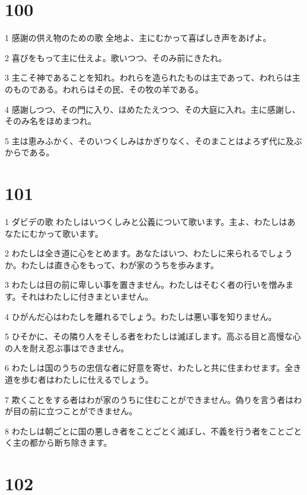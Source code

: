 \chapter{100}

\par 1 感謝の供え物のための歌 全地よ、主にむかって喜ばしき声をあげよ。
\par 2 喜びをもって主に仕えよ。歌いつつ、そのみ前にきたれ。
\par 3 主こそ神であることを知れ。われらを造られたものは主であって、われらは主のものである。われらはその民、その牧の羊である。
\par 4 感謝しつつ、その門に入り、ほめたたえつつ、その大庭に入れ。主に感謝し、そのみ名をほめまつれ。
\par 5 主は恵みふかく、そのいつくしみはかぎりなく、そのまことはよろず代に及ぶからである。

\chapter{101}

\par 1 ダビデの歌 わたしはいつくしみと公義について歌います。主よ、わたしはあなたにむかって歌います。
\par 2 わたしは全き道に心をとめます。あなたはいつ、わたしに来られるでしょうか。わたしは直き心をもって、わが家のうちを歩みます。
\par 3 わたしは目の前に卑しい事を置きません。わたしはそむく者の行いを憎みます。それはわたしに付きまといません。
\par 4 ひがんだ心はわたしを離れるでしょう。わたしは悪い事を知りません。
\par 5 ひそかに、その隣り人をそしる者をわたしは滅ぼします。高ぶる目と高慢な心の人を耐え忍ぶ事はできません。
\par 6 わたしは国のうちの忠信な者に好意を寄せ、わたしと共に住まわせます。全き道を歩む者はわたしに仕えるでしょう。
\par 7 欺くことをする者はわが家のうちに住むことができません。偽りを言う者はわが目の前に立つことができません。
\par 8 わたしは朝ごとに国の悪しき者をことごとく滅ぼし、不義を行う者をことごとく主の都から断ち除きます。

\chapter{102}


